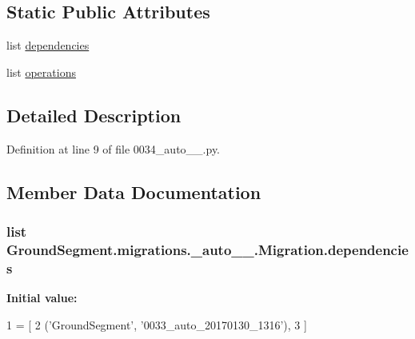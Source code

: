 \subsection*{Static Public Attributes}
\begin{DoxyCompactItemize}
\item 
list \hyperlink{class_ground_segment_1_1migrations_1_10034__auto__20170130__1320_1_1_migration_a3415e9525dfaf2ea5b74803c57e9893d}{dependencies}
\item 
list \hyperlink{class_ground_segment_1_1migrations_1_10034__auto__20170130__1320_1_1_migration_a4ca864875769777007ba49b4187764b7}{operations}
\end{DoxyCompactItemize}


\subsection{Detailed Description}


Definition at line 9 of file 0034\+\_\+auto\+\_\+\_.\+py.



\subsection{Member Data Documentation}
\hypertarget{class_ground_segment_1_1migrations_1_10034__auto__20170130__1320_1_1_migration_a3415e9525dfaf2ea5b74803c57e9893d}{}
\subsubsection[{dependencies}]{\setlength{\rightskip}{0pt plus 5cm}list Ground\+Segment.\+migrations.\+\_\+auto\+\_\+\_.\+Migration.\+dependencies\hspace{0.3cm}{\ttfamily [static]}}\label{class_ground_segment_1_1migrations_1_10034__auto__20170130__1320_1_1_migration_a3415e9525dfaf2ea5b74803c57e9893d}
{\bfseries Initial value\+:}
\begin{DoxyCode}
1 = [
2         (\textcolor{stringliteral}{'GroundSegment'}, \textcolor{stringliteral}{'0033\_auto\_20170130\_1316'}),
3     ]
\end{DoxyCode}


